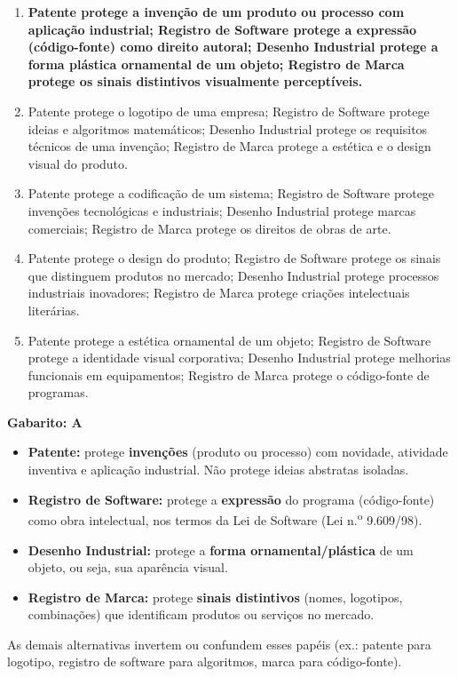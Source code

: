 \documentclass[12pt,a4paper]{article}
\begin{document}
\begin{enumerate}[label=\textbf{\Alph*)}, itemsep=0.2cm]
    \item[\textbf{A)}] \textbf{Patente protege a invenção de um produto ou processo com aplicação industrial; Registro de Software protege a expressão (código-fonte) como direito autoral; Desenho Industrial protege a forma plástica ornamental de um objeto; Registro de Marca protege os sinais distintivos visualmente perceptíveis.} \checkmark
    \item Patente protege o logotipo de uma empresa; Registro de Software protege ideias e algoritmos matemáticos; Desenho Industrial protege os requisitos técnicos de uma invenção; Registro de Marca protege a estética e o design visual do produto.
    \item Patente protege a codificação de um sistema; Registro de Software protege invenções tecnológicas e industriais; Desenho Industrial protege marcas comerciais; Registro de Marca protege os direitos de obras de arte.
    \item Patente protege o design do produto; Registro de Software protege os sinais que distinguem produtos no mercado; Desenho Industrial protege processos industriais inovadores; Registro de Marca protege criações intelectuais literárias.
    \item Patente protege a estética ornamental de um objeto; Registro de Software protege a identidade visual corporativa; Desenho Industrial protege melhorias funcionais em equipamentos; Registro de Marca protege o código-fonte de programas.
\end{enumerate}

\begin{tcolorbox}[respostabox]
\textbf{Gabarito: A}

\begin{itemize}
    \item \textbf{Patente:} protege \textbf{invenções} (produto ou processo) com novidade, atividade inventiva e aplicação industrial. Não protege ideias abstratas isoladas.
    \item \textbf{Registro de Software:} protege a \textbf{expressão} do programa (código-fonte) como obra intelectual, nos termos da Lei de Software (Lei n.\textsuperscript{o} 9.609/98).
    \item \textbf{Desenho Industrial:} protege a \textbf{forma ornamental/plástica} de um objeto, ou seja, sua aparência visual.
    \item \textbf{Registro de Marca:} protege \textbf{sinais distintivos} (nomes, logotipos, combinações) que identificam produtos ou serviços no mercado.
\end{itemize}

As demais alternativas invertem ou confundem esses papéis (ex.: patente para logotipo, registro de software para algoritmos, marca para código-fonte).
\end{tcolorbox}
\end{document}
